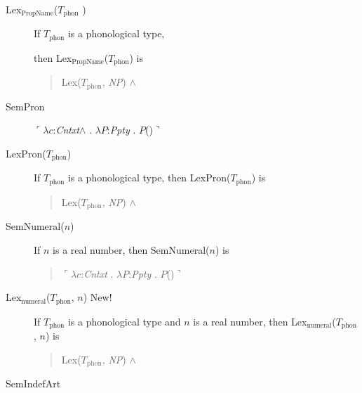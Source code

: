 \begin{description}
\item[\textnormal{Lex$_{\mathrm{PropName}}$($T_{\mathrm{phon}}$
    )}] \mbox{}

  If $T_{\mathrm{phon}}$ is a phonological type,

  then Lex$_{\mathrm{PropName}}$($T_{\mathrm{phon}}$) is
  \begin{quote}
    Lex($T_{\mathrm{phon}}$, \textit{NP}) \d{$\wedge$}
\end{quote}

\item[\textnormal{SemPron} ] \mbox{}

$\ulcorner\lambda c$:\textit{Cntxt}\d{$\wedge$} . $\lambda
  P$:\textit{Ppty}
  . $P$()$\urcorner$

\item[\textnormal{LexPron($T_{\text{phon}}$)}] \mbox{}

If $T_{\text{phon}}$ is a phonological type, then
LexPron($T_{\text{phon}}$) is
\begin{quote}
Lex($T_{\mathrm{phon}}$, \textit{NP}) \d{$\wedge$}
\end{quote}

\item[\textnormal{SemNumeral($n$)}] \mbox{}

  If $n$ is a real number, then SemNumeral($n$) is
  \begin{quote}
    $\ulcorner\lambda c$:\textit{Cntxt} . $\lambda P$:\textit{Ppty}
    . $P$()$\urcorner$
  \end{quote}

  
\item[\textnormal{Lex$_{\mathrm{numeral}}$($T_{\mathrm{phon}}$, $n$)}
    New!] \mbox{}

    If $T_{\mathrm{phon}}$ is a phonological type and $n$ is a real
    number, then Lex$_{\mathrm{numeral}}$($T_{\mathrm{phon}}$, $n$) is
    \begin{quote}
      Lex($T_{\mathrm{phon}}$, \textit{NP}) \d{$\wedge$}
    \end{quote}
    

  
\item[\textnormal{SemIndefArt}] \mbox{}


\end{description}
